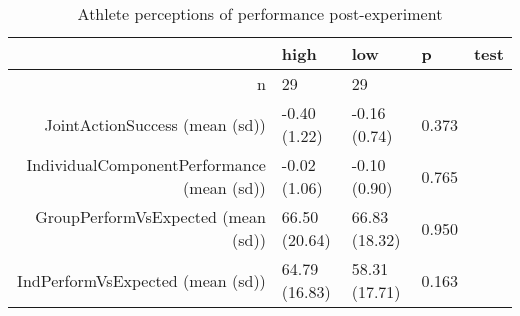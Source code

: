 \begin{table}[ht]
\centering
\begin{tabular}{rllll}
  \hline
 & high & low & p & test \\ 
  \hline
n &    29 &    29 &  &  \\ 
  JointActionSuccess (mean (sd)) & -0.40 (1.22) & -0.16 (0.74) &  0.373 &  \\ 
  IndividualComponentPerformance (mean (sd)) & -0.02 (1.06) & -0.10 (0.90) &  0.765 &  \\ 
  GroupPerformVsExpected (mean (sd)) & 66.50 (20.64) & 66.83 (18.32) &  0.950 &  \\ 
  IndPerformVsExpected (mean (sd)) & 64.79 (16.83) & 58.31 (17.71) &  0.163 &  \\ 
   \hline
\end{tabular}
\caption{Athlete perceptions of performance 
 post-experiment} 
\label{tab:performanceConditionPost}
\end{table}
